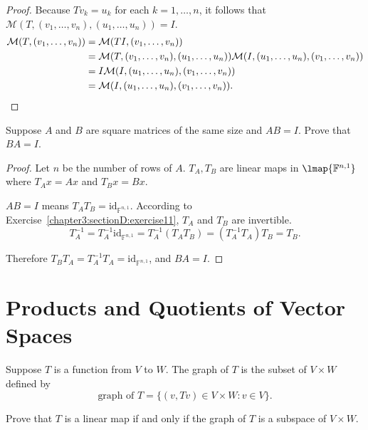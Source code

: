 \begin{proof}
    Because $Tv_{k} = u_{k}$ for each $k = 1,\ldots, n$, it follows that $\mathcal{M}(T, (v_{1}, \ldots, v_{n}), (u_{1}, \ldots, u_{n})) = I$.
    \begin{align*}
        \mathcal{M}(T, (v_{1}, \ldots, v_{n})) & = \mathcal{M}(TI, (v_{1}, \ldots, v_{n}))                                                                                      \\
                                               & = \mathcal{M}(T, (v_{1}, \ldots, v_{n}), (u_{1}, \ldots, u_{n}))\mathcal{M}(I, (u_{1}, \ldots, u_{n}), (v_{1}, \ldots, v_{n})) \\
                                               & = I\mathcal{M}(I, (u_{1}, \ldots, u_{n}), (v_{1}, \ldots, v_{n}))                                                              \\
                                               & = \mathcal{M}(I, (u_{1}, \ldots, u_{n}), (v_{1}, \ldots, v_{n})).\qedhere
    \end{align*}
\end{proof}
\newpage

\begin{exercise}
    Suppose $A$ and $B$ are square matrices of the same size and $AB = I$. Prove that $BA = I$.
\end{exercise}

\begin{proof}
    Let $n$ be the number of rows of $A$. $T_{A}, T_{B}$ are linear maps in $\lmap{\mathbb{F}^{n,1}}$ where $T_{A}x = Ax$ and $T_{B}x = Bx$.

    $AB = I$ means $T_{A}T_{B} = \text{id}_{\mathbb{F}^{n,1}}$. According to Exercise~\ref{chapter3:sectionD:exercise11}, $T_{A}$ and $T_{B}$ are invertible.
    \[
        T^{-1}_{A} = T^{-1}_{A}\text{id}_{\mathbb{F}^{n,1}} = T^{-1}_{A}(T_{A}T_{B}) = (T^{-1}_{A}T_{A})T_{B} = T_{B}.
    \]

    Therefore $T_{B}T_{A} = T^{-1}_{A}T_{A} = \text{id}_{\mathbb{F}^{n,1}}$, and $BA = I$.
\end{proof}
\newpage

\section{Products and Quotients of Vector Spaces}

\begin{exercise}
    Suppose $T$ is a function from $V$ to $W$. The graph of $T$ is the subset of $V\times W$ defined by
    \[
        \text{graph of $T$} = \{ (v, Tv)\in V\times W: v\in V \}.
    \]

    Prove that $T$ is a linear map if and only if the graph of $T$ is a subspace of $V\times W$.
\end{exercise}

